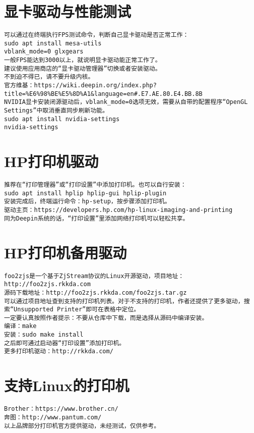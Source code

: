 \documentclass[a4paper,fontset=fandol,zihao=-4,linespread=1.2]{ctexbook}
\begin{document}
\section{显卡驱动与性能测试}
\begin{lstlisting}
可以通过在终端执行FPS测试命令，判断自己显卡驱动是否正常工作：
sudo apt install mesa-utils
vblank_mode=0 glxgears
一般FPS能达到3000以上，就说明显卡驱动能正常工作了。
建议使用应用商店的“显卡驱动管理器”切换或者安装驱动。
不到迫不得已，请不要升级内核。
官方维基：https://wiki.deepin.org/index.php?title=%E6%98%BE%E5%8D%A1&language=en#.E7.AE.80.E4.BB.8B
NVIDIA显卡安装闭源驱动后，vblank_mode=0选项无效，需要从自带的配置程序“OpenGL Settings”中取消垂直同步刷新功能。
sudo apt install nvidia-settings
nvidia-settings
\end{lstlisting}

\section{HP打印机驱动}
\begin{lstlisting}
推荐在“打印管理器”或“打印设置”中添加打印机。也可以自行安装：
sudo apt install hplip hplip-gui hplip-plugin
安装完成后，终端运行命令：hp-setup，按步骤添加打印机。
驱动主页：https://developers.hp.com/hp-linux-imaging-and-printing
同为Deepin系统的话，“打印设置”里添加网络打印机可以轻松共享。
\end{lstlisting}

\section{HP打印机备用驱动}
\begin{lstlisting}
foo2zjs是一个基于ZjStream协议的Linux开源驱动，项目地址：http://foo2zjs.rkkda.com
源码下载地址：http://foo2zjs.rkkda.com/foo2zjs.tar.gz
可以通过项目地址查到支持的打印机列表。对于不支持的打印机，作者还提供了更多驱动，搜索“Unsupported Printer”即可在表格中定位。
一定要认真按照作者提示：不要从仓库中下载，而是选择从源码中编译安装。
编译：make
安装：sudo make install
之后即可通过启动器“打印设置”添加打印机。
更多打印机驱动：http://rkkda.com/
\end{lstlisting}

\section{支持Linux的打印机}
\begin{lstlisting}
Brother：https://www.brother.cn/
奔图：http://www.pantum.com/
以上品牌部分打印机官方提供驱动，未经测试，仅供参考。
\end{lstlisting}
\end{document}
